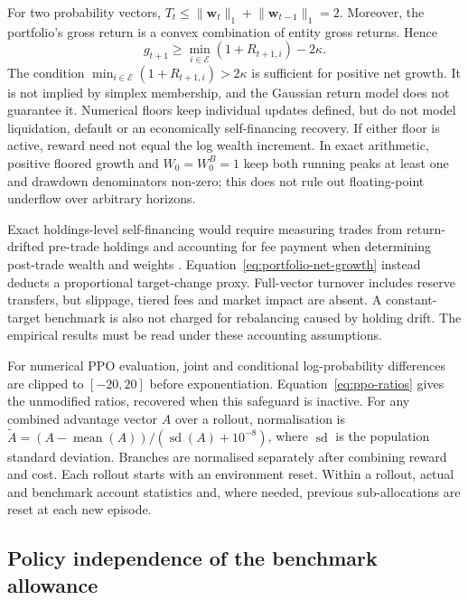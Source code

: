 \documentclass[10pt]{article}
\begin{document}
For two probability vectors,
$T_t\leq\lVert\bm w_t\rVert_1+\lVert\bm w_{t-1}\rVert_1=2$.
Moreover, the portfolio's gross return is a convex combination of entity gross returns. Hence
\begin{equation}
  g_{t+1}\geq
     \min_{i\in\mathcal E}(1+R_{t+1,i})-2\kappa.
  \label{eq:positive-growth-bound}
\end{equation}
The condition $\min_{i\in\mathcal E}(1+R_{t+1,i})>2\kappa$ is sufficient for positive net growth. It is not implied by simplex membership, and the Gaussian return model does not guarantee it. Numerical floors keep individual updates defined, but do not model liquidation, default or an economically self-financing recovery. If either floor is active, reward need not equal the log wealth increment. In exact arithmetic, positive floored growth and $W_0=W_0^B=1$ keep both running peaks at least one and drawdown denominators non-zero; this does not rule out floating-point underflow over arbitrary horizons.

Exact holdings-level self-financing would require measuring trades from return-drifted pre-trade holdings and accounting for fee payment when determining post-trade wealth and weights \citep{jiang2017}. Equation~\eqref{eq:portfolio-net-growth} instead deducts a proportional target-change proxy. Full-vector turnover includes reserve transfers, but slippage, tiered fees and market impact are absent. A constant-target benchmark is also not charged for rebalancing caused by holding drift. The empirical results must be read under these accounting assumptions.

For numerical PPO evaluation, joint and conditional log-probability differences are clipped to $[-20,20]$ before exponentiation. Equation~\eqref{eq:ppo-ratios} gives the unmodified ratios, recovered when this safeguard is inactive. For any combined advantage vector $A$ over a rollout, normalisation is
$\widetilde A=(A-\operatorname{mean}(A))/(\operatorname{sd}(A)+10^{-8})$,
where $\operatorname{sd}$ is the population standard deviation. Branches are normalised separately after combining reward and cost. Each rollout starts with an environment reset. Within a rollout, actual and benchmark account statistics and, where needed, previous sub-allocations are reset at each new episode.

\subsection{Policy independence of the benchmark allowance}
\end{document}
